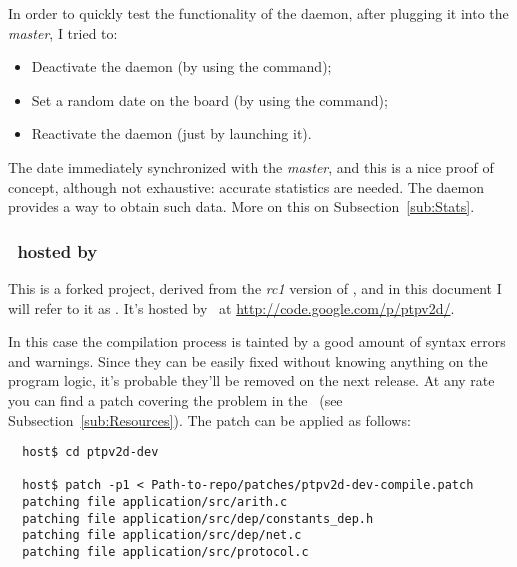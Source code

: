         In order to quickly test the functionality of the daemon, after
        plugging it into the \emph{master}, I tried to:
        \begin{itemize}
        \item   Deactivate the daemon (by using the 
                command);
        \item   Set a random date on the board (by using the 
                command);
        \item   Reactivate the daemon (just by launching it).
        \end{itemize}
        The date immediately synchronized with the \emph{master}, and this
        is a nice proof of concept, although not exhaustive: accurate
        statistics are needed.
        The daemon provides a way to obtain such data. More on this on
        Subsection~\ref{sub:Stats}.


    \subsubsection{ \PTPd\ hosted by \GoogleCode } \label{subsub:PTPdV2}

        This is a forked project, derived from the \emph{rc1} version of
        \PTPd, and in this document I will refer to it as \PTPdGC. It's
        hosted by \GoogleCode\ at \url{http://code.google.com/p/ptpv2d/}.

        In this case the compilation process is tainted by a good amount
        of syntax errors and warnings. Since they can be easily fixed
        without knowing anything on the program logic, it's probable
        they'll be removed on the next release. At any rate you can find a
        patch covering the problem in the \MyRepo\ (see
        Subsection~\ref{sub:Resources}). The patch can be applied as
        follows:
\begin{lstlisting}
  host$ cd ptpv2d-dev

  host$ patch -p1 < Path-to-repo/patches/ptpv2d-dev-compile.patch
  patching file application/src/arith.c
  patching file application/src/dep/constants_dep.h
  patching file application/src/dep/net.c
  patching file application/src/protocol.c
\end{lstlisting}


